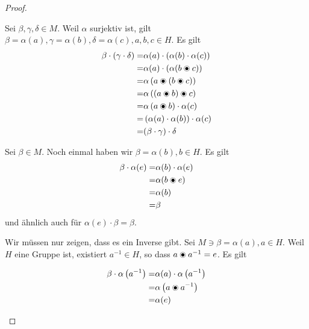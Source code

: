 \begin{proof}
	\begin{parts}
	\item Sei $\beta,\gamma,\delta\in M$. Weil $\alpha$ surjektiv ist, gilt $\beta=\alpha (a), \gamma=\alpha(b), \delta=\alpha(c),a,b,c\in H$. Es gilt
		\begin{align*}
			\beta\cdot(\gamma\cdot\delta)=&\alpha(a)\cdot\left( \alpha(b)\cdot \alpha(c) \right) \\
			=& \alpha(a)\cdot \left( \alpha(b \circledcirct c) \right) \\
			=& \alpha\left( a\circledcirct \left( b\circledcirct c \right)  \right) \\
			=& \alpha\left( \left( a\circledcirct b \right) \circledcirct c \right)\\
			=& \alpha\left( a\circledcirct b \right) \cdot \alpha(c)\\
			=& \left( \alpha(a)\cdot \alpha(b) \right) \cdot \alpha(c)\\
			=& (\beta\cdot\gamma)\cdot\delta
		\end{align*}
	\item Sei $\beta\in M$. Noch einmal haben wir $\beta=\alpha(b), b\in H$. Es gilt
		\begin{align*}
			\beta\cdot \alpha(e)=& \alpha(b)\cdot \alpha(e)\\
			=& \alpha(b\circledcirct e)\\
			=& \alpha(b)\\
			=& \beta
		\end{align*}
		und ähnlich auch für $\alpha(e)\cdot\beta=\beta$.
	\item Wir müssen nur zeigen, dass es ein Inverse gibt. Sei $M\ni \beta=\alpha(a), a\in H$. Weil  $H$ eine Gruppe ist, existiert $a^{-1}\in H$, so dass $a\circledcirct a^{-1}=e$. Es gilt

		 \begin{align*}
			 \beta\cdot \alpha\left( a^{-1} \right) =& \alpha(a)\cdot\alpha\left( a^{-1} \right) \\
			 =& \alpha\left( a\circledcirct a^{-1} \right) \\
			 =& \alpha(e)
		\end{align*}
	\end{parts}
\end{proof}
